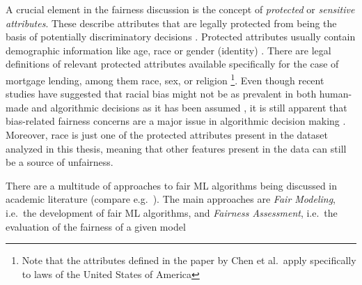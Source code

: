 A crucial element in the fairness discussion is the concept of \textit{protected} or \textit{sensitive attributes}. These describe attributes that are legally protected from being the basis of potentially discriminatory decisions \parencite{Datta2017}.
Protected attributes usually contain demographic information like age, race or gender (identity) \parencite{Teodorescu2020}. There are legal definitions of relevant protected attributes available specifically for the case of mortgage lending, among them race, sex, or religion \parencite{Chen2019}\footnote{Note that the attributes defined in the paper by Chen et al.\ apply specifically to laws of the United States of America}. 
Even though recent studies have suggested that racial bias might not be as prevalent in both human-made and algorithmic decisions as it has been assumed \parencite{Bhutta2022}, 
it is still apparent that bias-related fairness concerns are a major issue in algorithmic decision making \parencite{Mehrabi2021}.
Moreover, race is just one of the protected attributes present in the dataset analyzed in this thesis, meaning that other features present in the data can still be a source of unfairness.

There are a multitude of approaches to fair ML algorithms being discussed in academic literature (compare e.g.\ \cite{Mehrabi2021}). The main approaches are \textit{Fair Modeling}, i.e.\ the development of fair ML algorithms, and \textit{Fairness Assessment}, i.e.\ the evaluation of the fairness of a given model

